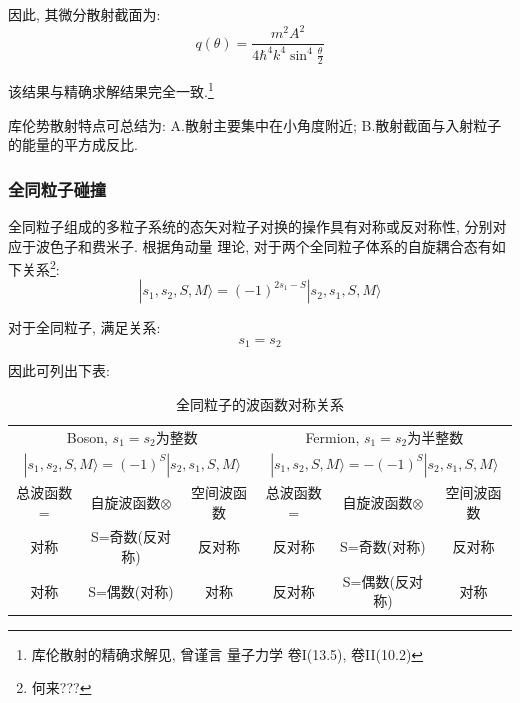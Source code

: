 \documentclass[a4paper, 11pt]{article}
\begin{document}
\begin{spacing}{1.2}
          因此, 其微分散射截面为:
          \begin{equation}
            q(\theta) = \dfrac{m^2A^2}{4\hbar^4k^4\sin^4\frac{\theta}{2}}
          \end{equation}

          该结果与精确求解结果完全一致.\footnote{库伦散射的精确求解见, 曾谨言 量子力学 卷I(13.5), 卷II(10.2)}

          库伦势散射特点可总结为: A.散射主要集中在小角度附近; B.散射截面与入射粒子的能量的平方成反比.
              
        \subsubsection{全同粒子碰撞}
          全同粒子组成的多粒子系统的态矢对粒子对换的操作具有对称或反对称性, 分别对应于波色子和费米子. 根据角动量
          理论, 对于两个全同粒子体系的自旋耦合态有如下关系\footnote{何来???}:
          \begin{equation}
            |s_1, s_2, S,M\rangle = (-1)^{2s_1-S}|s_2, s_1, S,M\rangle
          \end{equation}

            对于全同粒子, 满足关系: 
            \begin{equation}
              s_1 = s_2
            \end{equation}

            因此可列出下表:
          
          \begin{table}[H]
          \caption{全同粒子的波函数对称关系}
            \begin{tabular}{ccc|ccc}
              \toprule
              \multicolumn{3}{c|}{Boson, $s_1=s_2$为整数}&\multicolumn{3}{c}{Fermion, $s_1=s_2$为半整数}\\
              \multicolumn{3}{c|}{$|s_1, s_2, S,M\rangle = (-1)^{S}|s_2, s_1, S,M\rangle$} &%
              \multicolumn{3}{c}{$|s_1, s_2, S,M\rangle = -(-1)^{S}|s_2, s_1, S,M\rangle$}\\
              \hline
              总波函数=&自旋波函数$\otimes$&空间波函数&总波函数=&自旋波函数$\otimes$&空间波函数\\
              \hline
              对称&S=奇数(反对称)&反对称&反对称&S=奇数(对称)&反对称\\
              \hline
              对称&S=偶数(对称)&对称&反对称&S=偶数(反对称)&对称\\
              \bottomrule
            \end{tabular} 
          \end{table} 


\end{spacing}
\end{document}
